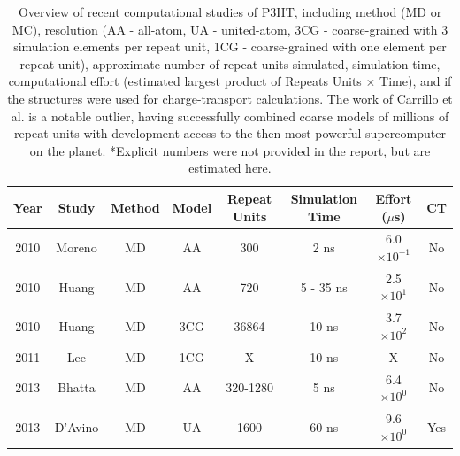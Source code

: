 \begin{landscape}
\begin{table}
    \caption[Overview of recent computational studies of P3HT, including method (MD or MC), resolution (AA - all-atom, UA - united-atom, 3CG - coarse-grained with 3 simulation elements per repeat unit, 1CG - coarse-grained with one element per repeat unit), approximate number of repeat units simulated, simulation time, computational effort (estimated largest product of Repeats Units $\times$ Time), and if the structures were used for charge-transport calculations. 
    The work of Carrillo et al. is a notable outlier, having successfully combined coarse models of millions of repeat units with development access to the then-most-powerful supercomputer on the planet.
    *Explicit numbers were not provided in the report, but are estimated here.]{Overview of recent computational studies of P3HT, including method (MD or MC), resolution (AA - all-atom, UA - united-atom, 3CG - coarse-grained with 3 simulation elements per repeat unit, 1CG - coarse-grained with one element per repeat unit), approximate number of repeat units simulated, simulation time, computational effort (estimated largest product of Repeats Units $\times$ Time), and if the structures were used for charge-transport calculations. 
    The work of Carrillo et al.\cite{Carrillo2013} is a notable outlier, having successfully combined coarse models of millions of repeat units with development access to the then-most-powerful supercomputer on the planet.
    *Explicit numbers were not provided in the report, but are estimated here.}
\centering
\begin{tabular}{|c|c|c|c|c|c|c|c|}
\hline
    Year & Study & Method & Model & Repeat Units & Simulation Time & Effort ($\mu$s)  & CT \\
\hline
    2010 & Moreno\cite{Moreno2010} & MD & AA & 300 & 2 ns & 6.0$\times 10^{-1}$  & No \\%
\hline
    2010 & Huang\cite{Huang2010} & MD & AA & 720 & 5 - 35 ns & 2.5$\times 10^{1}$  & No \\
\hline
    2010 & Huang\cite{Huang2010} & MD & 3CG & 36864 & 10 ns & 3.7$\times 10^{2}$  & No \\
\hline
    2011 & Lee\cite{Lee2011} & MD & 1CG & X & 10 ns & X  & No \\
\hline
    2013 & Bhatta\cite{Bhatta2013a} & MD & AA & 320-1280 & 5 ns & 6.4$\times 10^{0}$  & No \\%
\hline
    2013 & D'Avino\cite{DAvino2013} & MD & UA & 1600 & 60 ns & 9.6$\times 10^{0}$  & Yes \\

\end{tabular}
\end{table}
\end{landscape}
